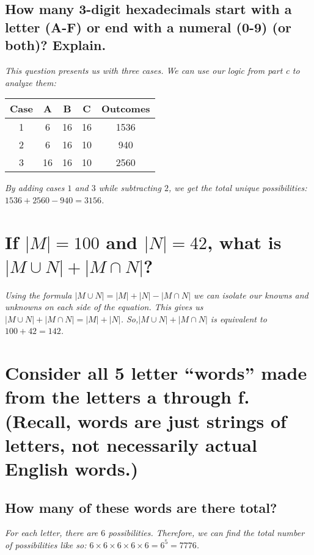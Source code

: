 \documentclass{article}
\begin{document}
\subsection{How many 3-digit hexadecimals start with a letter (A-F) or end with a numeral (0-9) (or both)? Explain.}
\hspace{1cm}\textit{This question presents us with three cases. We can use our logic from part c to
    analyze them:}
\begin{center}
    \begin{tabular}{c|c|c|c|c}
        Case & A & B & C & Outcomes \\
        \hline
        1 & 6 & 16 & 16 & 1536 \\
        \hline
        2 & 6 & 16 & 10 & 940 \\
        \hline
        3 & 16 & 16 & 10 & 2560 \\
        \hline
    \end{tabular}
\end{center}
\hspace{1cm}\textit{By adding cases $1$ and $3$ while subtracting $2$, we get the total unique
    possibilities: $1536+2560-940 = 3156$.}

\section{If $|M| = 100$ and $|N| = 42$, what is $|M\cup N|+|M\cap N|$?}
\hspace{1cm}\textit{Using the formula $|M\cup N|=|M|+|N|-|M\cap N|$ we can isolate our knowns and unknowns
    on each side of the equation. This gives us $|M\cup N|+|M\cap N| = |M|+|N|$. So,$|M\cup N|+|M\cap N|$
    is equivalent to $100+42 = 142$.}

\section{Consider all 5 letter “words” made from the letters a through f.
    (Recall, words are just strings of letters, not necessarily actual English words.)}
\subsection{How many of these words are there total?}
\hspace{1cm}\textit{For each letter, there are $6$ possibilities. Therefore, we can find the total number
    of possibilities like so: $6\times 6\times 6\times 6\times 6 = 6^5 = 7776$.}
\end{document}
